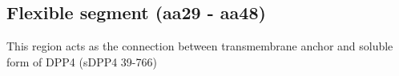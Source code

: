 \subsection{Flexible segment (aa29 - aa48)}

This region acts as the connection between transmembrane anchor and soluble form of DPP4 (sDPP4 39-766)
